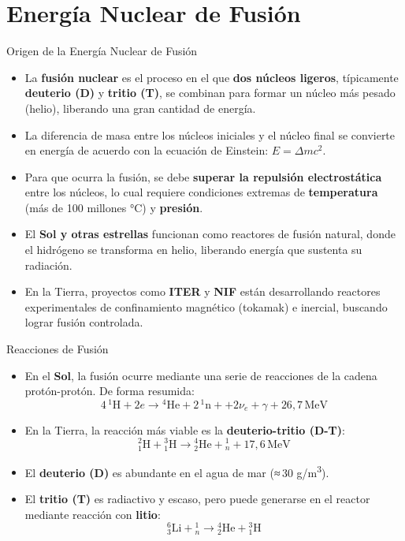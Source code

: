 \documentclass[main.tex]{subfiles}
\begin{document}
\section{Energía Nuclear de Fusión}
\begin{frame}{Origen de la Energía Nuclear de Fusión}
    \small
    \begin{itemize}
        \item La \textbf{fusión nuclear} es el proceso en el que \textbf{dos núcleos ligeros}, típicamente \textbf{deuterio (D)} y \textbf{tritio (T)}, se combinan para formar un núcleo más pesado (helio), liberando una gran cantidad de energía.
        \item La diferencia de masa entre los núcleos iniciales y el núcleo final se convierte en energía de acuerdo con la ecuación de Einstein: $E = \Delta m c^2$.
        \item Para que ocurra la fusión, se debe \textbf{superar la repulsión electrostática} entre los núcleos, lo cual requiere condiciones extremas de \textbf{temperatura} (más de 100 millones °C) y \textbf{presión}.
        \item El \textbf{Sol y otras estrellas} funcionan como reactores de fusión natural, donde el hidrógeno se transforma en helio, liberando energía que sustenta su radiación.
        \item En la Tierra, proyectos como \textbf{ITER} y \textbf{NIF} están desarrollando reactores experimentales de confinamiento magnético (tokamak) e inercial, buscando lograr fusión controlada.
    \end{itemize}
\end{frame}


\begin{frame}{Reacciones de Fusión}
    \begin{itemize}
        \item En el \textbf{Sol}, la fusión ocurre mediante una serie de reacciones de la cadena protón-protón. De forma resumida:
        \[
        4\,{}^1\text{H} + 2e \rightarrow {}^4\text{He} + 2\,{}^1\text{n}+ + 2\nu_e + \gamma + 26{,}7\,\text{MeV}
        \]
        \item En la Tierra, la reacción más viable es la \textbf{deuterio-tritio (D-T)}:
        \[
        {}^2_1\text{H} + {}^3_1\text{H} \rightarrow {}^4_2\text{He} + {}^1_n + 17{,}6\,\text{MeV}
        \]
        \item El \textbf{deuterio (D)} es abundante en el agua de mar (≈ 30 g/m\textsuperscript{3}).
        \item El \textbf{tritio (T)} es radiactivo y escaso, pero puede generarse en el reactor mediante reacción con \textbf{litio}:
        \[
        {}^6_3\text{Li} + {}^1_n \rightarrow {}^4_2\text{He} + {}^3_1\text{H}
        \]
    \end{itemize}
\end{frame}
\end{document}
